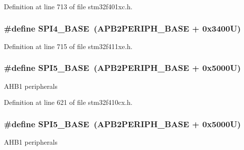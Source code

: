 Definition at line 713 of file stm32f401xc.\+h.

\subsubsection[{\texorpdfstring{S\+P\+I4\+\_\+\+B\+A\+SE}{SPI4_BASE}}]{\setlength{\rightskip}{0pt plus 5cm}\#define S\+P\+I4\+\_\+\+B\+A\+SE~({\bf A\+P\+B2\+P\+E\+R\+I\+P\+H\+\_\+\+B\+A\+SE} + 0x3400\+U)}\hypertarget{group___peripheral__registers__structures_gac5cfaedf263cee1e79554665f921c708}{}\label{group___peripheral__registers__structures_gac5cfaedf263cee1e79554665f921c708}


Definition at line 715 of file stm32f411xe.\+h.

\subsubsection[{\texorpdfstring{S\+P\+I5\+\_\+\+B\+A\+SE}{SPI5_BASE}}]{\setlength{\rightskip}{0pt plus 5cm}\#define S\+P\+I5\+\_\+\+B\+A\+SE~({\bf A\+P\+B2\+P\+E\+R\+I\+P\+H\+\_\+\+B\+A\+SE} + 0x5000\+U)}\hypertarget{group___peripheral__registers__structures_gac1c58d33414e167d478ecd0e31331dfa}{}\label{group___peripheral__registers__structures_gac1c58d33414e167d478ecd0e31331dfa}
A\+H\+B1 peripherals 

Definition at line 621 of file stm32f410cx.\+h.

\subsubsection[{\texorpdfstring{S\+P\+I5\+\_\+\+B\+A\+SE}{SPI5_BASE}}]{\setlength{\rightskip}{0pt plus 5cm}\#define S\+P\+I5\+\_\+\+B\+A\+SE~({\bf A\+P\+B2\+P\+E\+R\+I\+P\+H\+\_\+\+B\+A\+SE} + 0x5000\+U)}\hypertarget{group___peripheral__registers__structures_gac1c58d33414e167d478ecd0e31331dfa}{}\label{group___peripheral__registers__structures_gac1c58d33414e167d478ecd0e31331dfa}
A\+H\+B1 peripherals 

